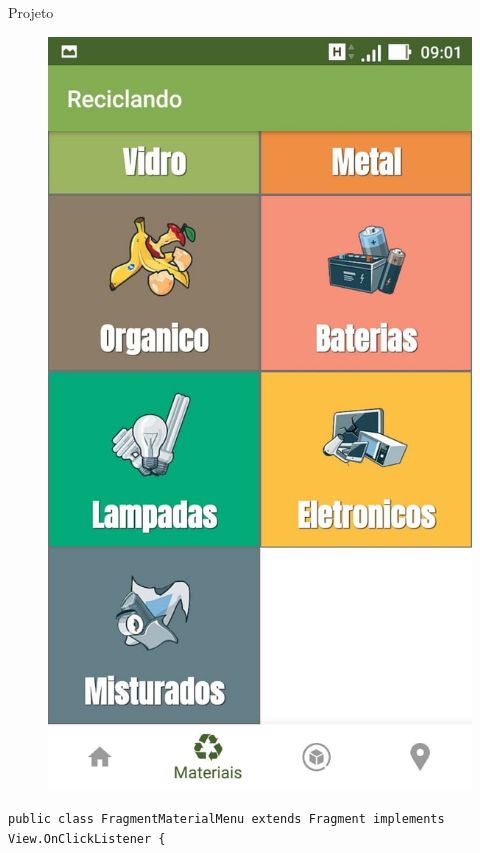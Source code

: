 \documentclass[
	12pt,				%
	openright,			%
	twoside,			%
	a4paper,			%
	english,			%
	french,				%
	spanish,			%
	brazil				%
	]{abntex2}
\begin{document}
\begin{chapter}{Projeto}
\begin{figure}[htb]
\begin{minipage}{0.45\textwidth}
    \includegraphics[scale=0.35]{media/tela_menu_material_2.jpg}
     \label{fig:tela_menu_material_2}
  \end{minipage}
\end{figure}

\begin{lstlisting}[numbers=none,
basicstyle=\small,
caption={FragmentMaterialMenu.java},
title={FragmentMaterialMenu.java},
label={FragmentMaterialMenu.java}]
public class FragmentMaterialMenu extends Fragment implements View.OnClickListener {


\end{lstlisting}
\end{chapter}
\end{document}

